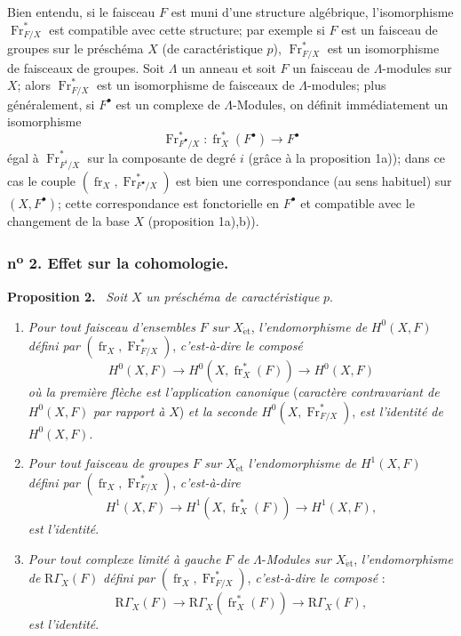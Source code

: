 \documentclass[11pt]{article}
\newenvironment{statement}[1]{\par\medskip\noindent\textbf{#1.}\ }{\par\medskip}
\providecommand{\et}{\mathrm{\acute{e}t}}
\providecommand{\fr}{\operatorname{fr}}
\providecommand{\Fr}{\operatorname{Fr}}
\providecommand{\Fr}{\operatorname{Fr}}
\providecommand{\fr}{\operatorname{fr}}
\providecommand{\et}{\acute{e}t}
\begin{document}
Bien entendu, si le faisceau $F$ est muni d'une structure algébrique, l'isomorphisme $\Fr^*_{F/X}$ est compatible avec cette structure; par exemple si $F$ est un faisceau de groupes sur le préschéma $X$ (de caractéristique $p$), $\Fr^*_{F/X}$ est un isomorphisme de faisceaux de groupes. Soit $\Lambda$ un anneau et soit $F$ un faisceau de $\Lambda$-modules sur $X$; alors $\operatorname{Fr}^*_{F/X}$ est un isomorphisme de faisceaux de $\Lambda$-modules; plus généralement, si $F^\bullet$ est un complexe de $\Lambda$-Modules, on définit immédiatement un isomorphisme
\[
\Fr^*_{F^\bullet/X}:\fr_X^*(F^\bullet)\longrightarrow F^\bullet
\]
égal à $\Fr^*_{F^i/X}$ sur la composante de degré $i$ (grâce à la proposition 1a)); dans ce cas le couple $(\fr_X,\Fr^*_{F^\bullet/X})$ est bien une correspondance (au sens habituel) sur $(X,F^\bullet)$; cette correspondance est fonctorielle en $F^\bullet$ et compatible avec le changement de la base $X$ (proposition 1a),b)).

\subsubsection*{n\textsuperscript{o} 2. Effet sur la cohomologie.}

\begin{statement}{Proposition 2}
\emph{Soit} $X$ \emph{un préschéma de caractéristique} $p$.
\begin{enumerate}[label=\alph*)]
\item \emph{Pour tout faisceau d'ensembles} $F$ \emph{sur} $X_{\et}$, \emph{l'endomorphisme de} $H^0(X,F)$ \emph{défini par} $(\fr_X,\Fr^*_{F/X})$, \emph{c'est-à-dire le composé}
\[
H^0(X,F)\longrightarrow H^0(X,\fr_X^*(F))\longrightarrow H^0(X,F)
\]
\emph{où la première flèche est l'application canonique} (\emph{caractère contravariant de} $H^0(X,F)$ \emph{par rapport à} $X$) \emph{et la seconde} $H^0(X,\Fr^*_{F/X})$, \emph{est l'identité de} $H^0(X,F)$.
\item
\emph{Pour tout faisceau de groupes} $F$ \emph{sur} $X_{\et}$ \emph{l'endomorphisme de} $H^1(X,F)$ \emph{défini par} $(\fr_X,\Fr^*_{F/X})$, \emph{c'est-à-dire}
\[
H^1(X,F)\longrightarrow H^1(X,\fr_X^*(F))\longrightarrow H^1(X,F),
\]
\emph{est l'identité}.
\item \emph{Pour tout complexe limité à gauche} $F$ \emph{de} $\Lambda$-\emph{Modules sur} $X_{\et}$, \emph{l'endomorphisme de} $\mathrm{R}\Gamma_X(F)$ \emph{défini par} $(\fr_X,\Fr^*_{F/X})$, \emph{c'est-à-dire le composé} :
\[
\mathrm{R}\Gamma_X(F)\longrightarrow \mathrm{R}\Gamma_X(\fr_X^*(F))\longrightarrow \mathrm{R}\Gamma_X(F),
\]
\emph{est l'identité}.
\end{enumerate}
\end{statement}
\end{document}
